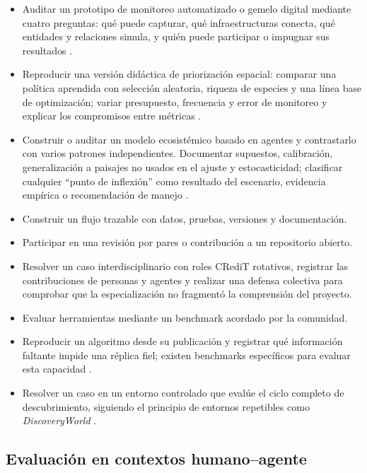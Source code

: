 \documentclass[11pt,a4paper]{article}
\begin{document}
\begin{itemize}
  riqueza o abundancia total mejora mientras desaparecen un hábitat o especies
  especialistas. Explicar qué oculta cada agregación y qué evidencia adicional
  requiere una decisión \citep{buckland2005monitoring}.
  \item Auditar un prototipo de monitoreo automatizado o gemelo digital mediante
  cuatro preguntas: qué puede capturar, qué infraestructuras conecta, qué entidades
  y relaciones simula, y quién puede participar o impugnar sus resultados
  \citep{westerlaken2024digital}.
  \item Reproducir una versión didáctica de priorización espacial: comparar una
  política aprendida con selección aleatoria, riqueza de especies y una línea base
  de optimización; variar presupuesto, frecuencia y error de monitoreo y explicar
  los compromisos entre métricas \citep{silvestro2022improving}.
  \item Construir o auditar un modelo ecosistémico basado en agentes y contrastarlo
  con varios patrones independientes. Documentar supuestos, calibración,
  generalización a paisajes no usados en el ajuste y estocasticidad; clasificar
  cualquier ``punto de inflexión'' como resultado del escenario, evidencia
  empírica o recomendación de manejo \citep{strannegard2026ecosystem}.
  \item Construir un flujo trazable con datos, pruebas, versiones y documentación.
  \item Participar en una revisión por pares o contribución a un repositorio
  abierto.
  \item Resolver un caso interdisciplinario con roles CRediT rotativos, registrar
  las contribuciones de personas y agentes y realizar una defensa colectiva para
  comprobar que la especialización no fragmentó la comprensión del proyecto.
  \item Evaluar herramientas mediante un benchmark acordado por la comunidad.
  \item Reproducir un algoritmo desde su publicación y registrar qué información
  faltante impide una réplica fiel; existen benchmarks específicos para evaluar
  esta capacidad \citep{xiang2025scireplicate}.
  \item Resolver un caso en un entorno controlado que evalúe el ciclo completo de
  descubrimiento, siguiendo el principio de entornos repetibles como
  \emph{DiscoveryWorld} \citep{jansen2024discoveryworld}.
\end{itemize}

\subsection{Evaluación en contextos humano--agente}
\end{document}

